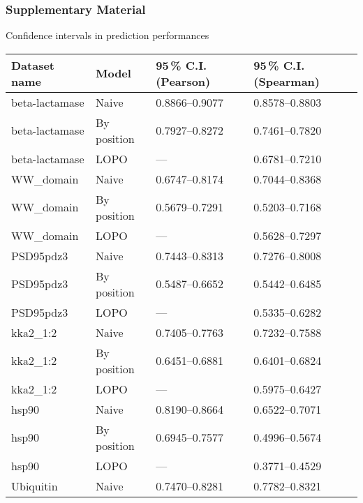 \documentclass[10pt, british, luatex]{beamer}
\begin{document}
\begin{frame}
	\frametitle{Supplementary Material}
	Confidence intervals in prediction performances
	\vfill%
	\tiny%
	\begin{tabular*}{\linewidth}{@{\extracolsep{\fill}}llll}%
		\toprule
		Dataset name            & Model       & \num{95}\,\% C.I. (Pearson) & \num{95}\,\% C.I. (Spearman) \\
		\midrule
		beta-lactamase & Naive       & \numrange{0.8866}{0.9077}        & \numrange{0.8578}{0.8803}         \\
		beta-lactamase & By position & \numrange{0.7927}{0.8272}        & \numrange{0.7461}{0.7820}         \\
		beta-lactamase & LOPO        & ---                              & \numrange{0.6781}{0.7210}         \\
		WW\_domain     & Naive       & \numrange{0.6747}{0.8174}        & \numrange{0.7044}{0.8368}         \\
		WW\_domain     & By position & \numrange{0.5679}{0.7291}        & \numrange{0.5203}{0.7168}         \\
		WW\_domain     & LOPO        & ---                              & \numrange{0.5628}{0.7297}         \\
		PSD95pdz3      & Naive       & \numrange{0.7443}{0.8313}        & \numrange{0.7276}{0.8008}         \\
		PSD95pdz3      & By position & \numrange{0.5487}{0.6652}        & \numrange{0.5442}{0.6485}         \\
		PSD95pdz3      & LOPO        & ---                              & \numrange{0.5335}{0.6282}         \\
		kka2\_1:2      & Naive       & \numrange{0.7405}{0.7763}        & \numrange{0.7232}{0.7588}         \\
		kka2\_1:2      & By position & \numrange{0.6451}{0.6881}        & \numrange{0.6401}{0.6824}         \\
		kka2\_1:2      & LOPO        & ---                              & \numrange{0.5975}{0.6427}         \\
		hsp90          & Naive       & \numrange{0.8190}{0.8664}        & \numrange{0.6522}{0.7071}         \\
		hsp90          & By position & \numrange{0.6945}{0.7577}        & \numrange{0.4996}{0.5674}         \\
		hsp90          & LOPO        & ---                              & \numrange{0.3771}{0.4529}         \\
		Ubiquitin      & Naive       & \numrange{0.7470}{0.8281}        & \numrange{0.7782}{0.8321}         \\

\end{tabular*}
\end{frame}
\end{document}
